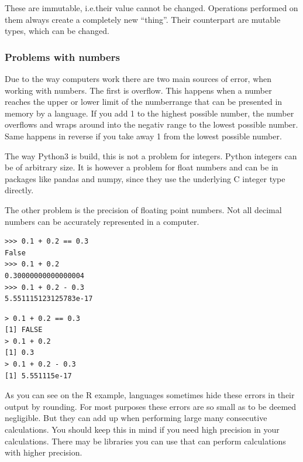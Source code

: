 \documentclass{article}
\begin{document}
These are immutable, i.e.\@ their value cannot be changed.
Operations performed on them always create a completely new ``thing''.
Their counterpart are mutable types, which can be changed.

\subsubsection{Problems with numbers}

Due to the way computers work there are two main sources of error, when working
with numbers.
The first is overflow.
This happens when a number reaches the upper or lower limit of the numberrange
that can be presented in memory by a language.
If you add 1 to the highest possible number, the number overflows and wraps around
into the negativ range to the lowest possible number.
Same happens in reverse if you take away 1 from the lowest possible number.

The way Python3 is build, this is not a problem for integers.
Python integers can be of arbitrary size.
It is however a problem for float numbers and can be in packages like pandas
and numpy, since they use the underlying C integer type directly.

The other problem is the precision of floating point numbers.
Not all decimal numbers can be accurately represented in a computer.


\begin{lstlisting}[title={Precision error in Python}]
>>> 0.1 + 0.2 == 0.3
False
>>> 0.1 + 0.2
0.30000000000000004
>>> 0.1 + 0.2 - 0.3
5.551115123125783e-17
\end{lstlisting}

\begin{lstlisting}[title={Precision error in R}]
> 0.1 + 0.2 == 0.3
[1] FALSE
> 0.1 + 0.2
[1] 0.3
> 0.1 + 0.2 - 0.3
[1] 5.551115e-17
\end{lstlisting}

As you can see on the R example, languages sometimes hide these errors in their
output by rounding.
For most purposes these errors are so small as to be deemed negligible.
But they can add up when performing large many consecutive calculations.
You should keep this in mind if you need high precision in your calculations.
There may be libraries you can use that can perform calculations with higher
precision.


\end{document}

